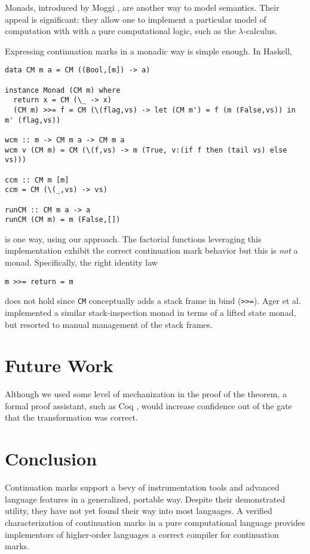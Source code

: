 \documentclass{llncs}
\newcommand{\lc}[0]{$\lambda$-calculus}
\begin{document}
Monads, introduced by Moggi \cite{moggi1989computational}, are another way to model semantics. Their appeal is significant: they allow one to implement a particular model of computation with with a pure computational logic, such as the \lc.

Expressing continuation marks in a monadic way is simple enough. In Haskell,
\begin{verbatim}
data CM m a = CM ((Bool,[m]) -> a)

instance Monad (CM m) where
  return x = CM (\_ -> x)
  (CM m) >>= f = CM (\(flag,vs) -> let (CM m') = f (m (False,vs)) in m' (flag,vs))

wcm :: m -> CM m a -> CM m a
wcm v (CM m) = CM (\(f,vs) -> m (True, v:(if f then (tail vs) else vs)))

ccm :: CM m [m]
ccm = CM (\(_,vs) -> vs)

runCM :: CM m a -> a
runCM (CM m) = m (False,[])
\end{verbatim}
is one way, using our approach. The factorial functions leveraging this implementation exhibit the correct continuation mark behavior but this is \emph{not} a monad. Specifically, the right identity law
\begin{verbatim}
m >>= return = m
\end{verbatim}
does not hold since \texttt{CM} conceptually adds a stack frame in bind (\texttt{>>=}). Ager et al. \cite{ager2003functional} implemented a similar stack-inspection monad in terms of a lifted state monad, but resorted to manual management of the stack frames.

\section{Future Work}

Although we used some level of mechanization in the proof of the theorem, a formal proof assistant, such as Coq \cite{barras1997coq}, would increase confidence out of the gate that the transformation was correct.

\section{Conclusion}

Continuation marks support a bevy of instrumentation tools and advanced language features in a generalized, portable way. Despite their demonstrated utility, they have not yet found their way into most languages. A verified characterization of continuation marks in a pure computational language provides implementors of higher-order languages a correct compiler for continuation marks.



\end{document}
